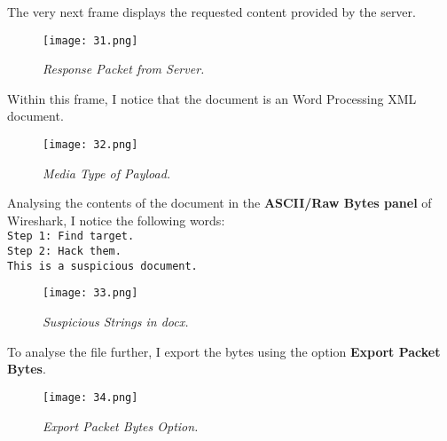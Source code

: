 The very next frame displays the requested content provided by the server.

\begin{figure}[H]
    \setlength{\abovecaptionskip}{20pt}
    \setlength{\belowcaptionskip}{0pt}
    \centering
    \texttt{[image: 31.png]}
    \captionsetup{justification=centering}
    \caption{\textit{Response Packet from Server.}}
    \label{fig:31}
\end{figure}
\vspace{-10pt}

Within this frame, I notice that the document is an Word Processing XML document. 

\begin{figure}[H]
    \setlength{\abovecaptionskip}{20pt}
    \setlength{\belowcaptionskip}{0pt}
    \centering
    \texttt{[image: 32.png]}
    \captionsetup{justification=centering}
    \caption{\textit{Media Type of Payload.}}
    \label{fig:32}
\end{figure}
\vspace{-10pt}

Analysing the contents of the document in the \textbf{ASCII/Raw Bytes panel} of Wireshark, I notice the following words:\\
\texttt{Step 1: Find target.}\\
\texttt{Step 2: Hack them.}\\
\texttt{This is a suspicious document.}\\

\begin{figure}[H]
    \setlength{\abovecaptionskip}{20pt}
    \setlength{\belowcaptionskip}{0pt}
    \centering
    \texttt{[image: 33.png]}
    \captionsetup{justification=centering}
    \caption{\textit{Suspicious Strings in docx.}}
    \label{fig:33}
\end{figure}
\vspace{-10pt}

To analyse the file further, I export the bytes using the option \textbf{Export Packet Bytes}.

\begin{figure}[H]
    \setlength{\abovecaptionskip}{20pt}
    \setlength{\belowcaptionskip}{0pt}
    \centering
    \texttt{[image: 34.png]}
    \captionsetup{justification=centering}
    \caption{\textit{Export Packet Bytes Option.}}
    \label{fig:34}
\end{figure}
\vspace{-10pt}

